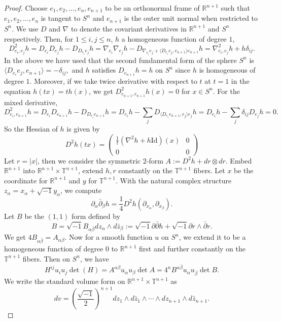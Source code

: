 \documentclass[reqno]{amsart}
\theoremstyle{remark}
\def\R{\mathbb{R}}
\theoremstyle{plain}
\begin{document}
\begin{proof}
    

Choose $e_1,e_2,...,e_n,e_{n+1}$ to be an orthonormal frame of $\mathbb{R}^{n+1}$ such that $e_1,e_2,...,e_n$ is tangent to $S^n$ and $e_{n+1}$ is the outer unit normal when restricted to $S^n$. We use $D$ and $\nabla$ to denote the covariant derivatives in $\mathbb{R}^{n+1}$ and $S^n$ respectively. Then, for $1\leq i,j\leq n$, $h$ a homogeneous function of degree $1$, \[
D^2_{e_i,e_j}h=D_{e_i}D_{e_j}h-D_{D_{e_i}e_j}h=\nabla_{e_i}\nabla_{e_j}h-D_{\nabla_{e_i}e_j+\langle D_{e_i}e_j,e_{n+1}\rangle e_{n+1}}h=\nabla^2_{e_i,e_j}h+h\delta_{ij}.
\]In the above we have used that the second fundamental form of the sphere $S^n$ is $\langle D_{e_i}e_j,e_{n+1}\rangle=-\delta_{ij},$ and $h$ satisfies $D_{e_{n+1}}h=h$ on $S^n$ since $h$ is homogeneous of degree $1$. Moreover, if we take twice derivative with respect to $t$ at $t=1$ in the equation 
$h(tx)=th(x)$, we get $D^2_{e_{n+1},e_{n+1}}h(x)=0$ for $x\in S^n$. For the mixed derivative, \[
D^2_{e_i,e_{n+1}}h=D_{e_i}D_{e_{n+1}}h-D_{D_{e_i}e_{n+1}}h=D_{e_i}h-\sum_jD_{\langle D_{e_i}e_{n+1},e_j\rangle e_j}h=D_{e_i}h-\sum_j\delta_{ij}D_{e_j}h=0.
\]
So the Hessian of $h$ is given by \[
D^2h(tx)=\begin{pmatrix}
    \frac{1}{t}(\nabla^2 h+h\text{Id})(x)&0\\
    0&0
\end{pmatrix}\]
Let $r=|x|$, then we consider the symmetric $2$-form $A:=D^2h+dr\otimes dr.$ Embed $\mathbb{R}^{n+1}$ into $\mathbb{R}^{n+1}\times \mathbb{T}^{n+1}$, extend $h,r$ constantly on the $\mathbb{T}^{n+1}$ fibers. Let $x$ be the coordinate for $\mathbb{R}^{n+1}$ and $y$ for $\mathbb{T}^{n+1}$. With the natural complex structure $z_\alpha=x_\alpha+\sqrt{-1}y_\alpha$, we compute \[\partial_\alpha\bar{\partial}_\beta h=\frac{1}{4}D^2h(\partial_{x_\alpha},\partial_{x_\beta}).\] Let $B$ be the $(1, 1)$ form defined by  \[B=\sqrt{-1}B_{\alpha\bar{\beta}}dz_\alpha\wedge d\bar{z}_\beta:=\sqrt{-1}\partial\bar{\partial}h+\sqrt{-1}\partial r\wedge\bar{\partial}r.\] We get $4B_{\alpha\bar{\beta}}=A_{\alpha\beta}$. Now for a smooth function $u$ on $S^n$, we extend it to be a homogeneous function of degree $0$ to $\mathbb{R}^{n+1}$ first and further constantly on the $\mathbb{T}^{n+1}$ fibers. Then on $S^n$, we have \[
H^{ij}u_iu_j\det(H)=A^{\alpha\beta}u_\alpha u_\beta \det A= 4^{n}B^{\alpha\bar{\beta}}u_\alpha u_{\bar{\beta}}\det B.
\]
We write the standard volume form on $\R^{n+1}\times \mathbb{T}^{n+1}$ as
\[
dv=\left(\frac{\sqrt{-1}}{2}\right)^{n+1}dz_1\wedge d\bar{z}_1\wedge\cdots\wedge dz_{n+1}\wedge d\bar{z}_{n+1}.
\]
\end{proof}
\end{document}
